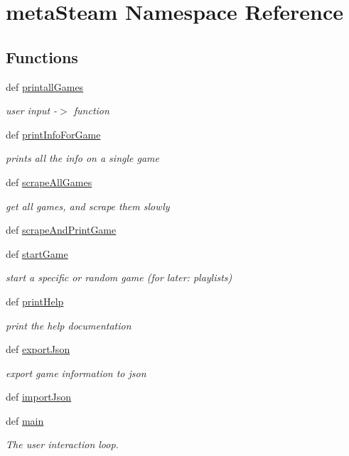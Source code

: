 \hypertarget{namespacemeta_steam}{\section{meta\+Steam Namespace Reference}
\label{namespacemeta_steam}
}
\subsection*{Functions}
\begin{DoxyCompactItemize}
\item 
def \hyperlink{namespacemeta_steam_ac19e5b2b462300c1ab5a320900d7c93b}{printall\+Games}
\begin{DoxyCompactList}\small\item\em user input -\/$>$ function \end{DoxyCompactList}\item 
def \hyperlink{namespacemeta_steam_a2d6ff00a0d1702a02ffaea0fddf84cb7}{print\+Info\+For\+Game}
\begin{DoxyCompactList}\small\item\em prints all the info on a single game \end{DoxyCompactList}\item 
def \hyperlink{namespacemeta_steam_abcf03e99fea34697691c1e3b5572aa27}{scrape\+All\+Games}
\begin{DoxyCompactList}\small\item\em get all games, and scrape them slowly \end{DoxyCompactList}\item 
def \hyperlink{namespacemeta_steam_a926c83f223c5f1d110246bc448fcc1e3}{scrape\+And\+Print\+Game}
\item 
def \hyperlink{namespacemeta_steam_a4fd0814c8d2980d8cdc7baed0e733588}{start\+Game}
\begin{DoxyCompactList}\small\item\em start a specific or random game (for later\+: playlists) \end{DoxyCompactList}\item 
def \hyperlink{namespacemeta_steam_aba7bea32668601ae15aebcd436128c90}{print\+Help}
\begin{DoxyCompactList}\small\item\em print the help documentation \end{DoxyCompactList}\item 
def \hyperlink{namespacemeta_steam_a012c898f91eb4ce14f9e16b1bbe76c69}{export\+Json}
\begin{DoxyCompactList}\small\item\em export game information to json \end{DoxyCompactList}\item 
def \hyperlink{namespacemeta_steam_ae2c97e161b9e6d6b65daad8b83fe4d3c}{import\+Json}
\item 
def \hyperlink{namespacemeta_steam_af9130303bff378cfcf624a0302102398}{main}
\begin{DoxyCompactList}\small\item\em The user interaction loop. \end{DoxyCompactList}\end{DoxyCompactItemize}

